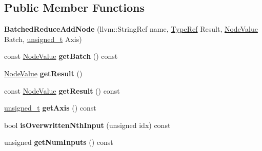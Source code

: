 \subsection*{Public Member Functions}
\begin{DoxyCompactItemize}
\item 
\mbox{\label{classglow_1_1_batched_reduce_add_node_a22c39252aa2761eb3072e5b4f652eeab}} 
{\bfseries Batched\+Reduce\+Add\+Node} (llvm\+::\+String\+Ref name, \hyperlink{structglow_1_1_type}{Type\+Ref} Result, \hyperlink{structglow_1_1_node_value}{Node\+Value} Batch, \hyperlink{namespaceglow_a0ca574644e1e42ef193a9947fb4d8911}{unsigned\+\_\+t} Axis)
\item 
\mbox{\label{classglow_1_1_batched_reduce_add_node_aa60b0e58e78cc5bff200b56d3e1789ec}} 
const \hyperlink{structglow_1_1_node_value}{Node\+Value} {\bfseries get\+Batch} () const
\item 
\mbox{\label{classglow_1_1_batched_reduce_add_node_a662882de71ef52dac1a494131f2c2133}} 
\hyperlink{structglow_1_1_node_value}{Node\+Value} {\bfseries get\+Result} ()
\item 
\mbox{\label{classglow_1_1_batched_reduce_add_node_ab880e14a788eae9447be29d4ba98d100}} 
const \hyperlink{structglow_1_1_node_value}{Node\+Value} {\bfseries get\+Result} () const
\item 
\mbox{\label{classglow_1_1_batched_reduce_add_node_a8e507ec69b0f47a5703d0b30cf20923a}} 
\hyperlink{namespaceglow_a0ca574644e1e42ef193a9947fb4d8911}{unsigned\+\_\+t} {\bfseries get\+Axis} () const
\item 
\mbox{\label{classglow_1_1_batched_reduce_add_node_a94e21a568dacf83f9e90603e2deb9f0c}} 
bool {\bfseries is\+Overwritten\+Nth\+Input} (unsigned idx) const
\item 
\mbox{\label{classglow_1_1_batched_reduce_add_node_a77035a4c194071a947221e2211d709cd}} 
unsigned {\bfseries get\+Num\+Inputs} () const
\item 
\mbox{\label{classglow_1_1_batched_reduce_add_node_a8bd62d90b9b658fede4fba2f59e26200}} 

\end{DoxyCompactItemize}
